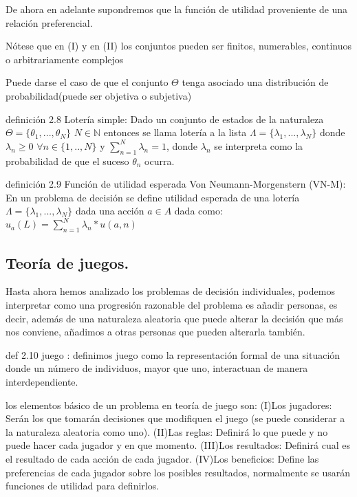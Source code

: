 \documentclass[14pt, a4paper]{article} %
\begin{document}
De ahora en adelante supondremos que la función de utilidad proveniente de una relación preferencial.
 
Nótese que en (I) y en (II) los conjuntos pueden ser finitos, numerables, continuos o arbitrariamente complejos

Puede darse el caso de que el conjunto $\Theta$ tenga asociado una distribución de probabilidad(puede ser objetiva o subjetiva)

definición 2.8 Lotería simple: Dado un conjunto de estados de la naturaleza $\Theta =\{ \theta_1,...,\theta_N \} $ $N \in \mathbb{N}$ entonces se llama lotería a la lista $\Lambda =\{ \lambda_1,...,\lambda_N\} $ donde $\lambda_n \ge 0$ $\forall n \in \{ 1,..,N\} $ y $\sum_{n=1}^{N} \lambda_n=1$, donde $\lambda_n$ se interpreta como la probabilidad de que el suceso $\theta_n$ ocurra.



definición 2.9 Función de utilidad esperada Von Neumann-Morgenstern (VN-M):
En un problema de decisión se define utilidad esperada de una lotería $ \Lambda =\{ \lambda_1,...,\lambda_N\} $ dada una acción $a \in A$ dada  como:
$u_a(L)=\sum_{n=1}^{N}\lambda_n*u(a,n)$

\subsection{Teoría de juegos.}


Hasta ahora hemos analizado los problemas de decisión individuales, podemos interpretar como una progresión razonable del problema es añadir personas, es decir, además de una naturaleza aleatoria que puede alterar la decisión que más nos conviene, añadimos a otras personas que pueden alterarla también.

def 2.10 juego :
definimos juego como la representación formal de una situación donde un número de individuos, mayor que uno, interactuan de manera interdependiente.

los elementos básico de un problema en teoría de juego son:
(I)Los jugadores: Serán los que tomarán decisiones que modifiquen el juego (se puede considerar a la naturaleza aleatoria como uno).
(II)Las reglas: Definirá lo que puede y no puede hacer cada jugador y en que momento.
(III)Los resultados: Definirá cual es el resultado de cada acción de cada jugador.
(IV)Los beneficios: Define las preferencias de cada jugador sobre los posibles resultados, normalmente se usarán funciones de utilidad para definirlos.
\end{document}
